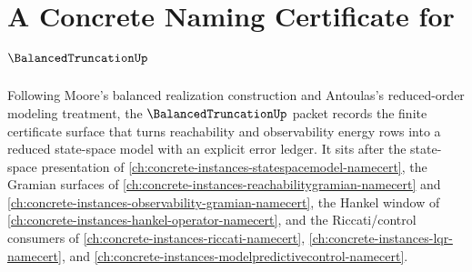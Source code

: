 \chapter{A Concrete Naming Certificate for $\BalancedTruncationUp$}
\label{ch:concrete-instances-balanced-truncation-namecert}

Following Moore's balanced realization construction and Antoulas's reduced-order modeling treatment, the $\BalancedTruncationUp$ packet records the finite certificate surface that turns reachability and observability energy rows into a reduced state-space model with an explicit error ledger. It sits after the state-space presentation of \autoref{ch:concrete-instances-statespacemodel-namecert}, the Gramian surfaces of \autoref{ch:concrete-instances-reachabilitygramian-namecert} and \autoref{ch:concrete-instances-observability-gramian-namecert}, the Hankel window of \autoref{ch:concrete-instances-hankel-operator-namecert}, and the Riccati/control consumers of \autoref{ch:concrete-instances-riccati-namecert}, \autoref{ch:concrete-instances-lqr-namecert}, and \autoref{ch:concrete-instances-modelpredictivecontrol-namecert}.

